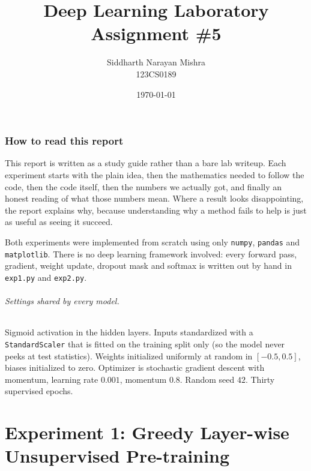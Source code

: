 \documentclass[12pt]{article}
\title{
Deep Learning Laboratory\\
Assignment \#5
}
\author{
Siddharth Narayan Mishra\\
123CS0189
}
\date{\today}
\begin{document}
\maketitle

\tableofcontents

\newpage


\section*{How to read this report}

This report is written as a study guide rather than a bare lab writeup. Each
experiment starts with the plain idea, then the mathematics needed to follow the
code, then the code itself, then the numbers we actually got, and finally an
honest reading of what those numbers mean. Where a result looks disappointing,
the report explains why, because understanding why a method fails to help is
just as useful as seeing it succeed.

Both experiments were implemented from scratch using only \texttt{numpy},
\texttt{pandas} and \texttt{matplotlib}. There is no deep learning framework
involved: every forward pass, gradient, weight update, dropout mask and softmax
is written out by hand in \texttt{exp1.py} and \texttt{exp2.py}.

\paragraph{Settings shared by every model.}
Sigmoid activation in the hidden layers. Inputs standardized with a
\texttt{StandardScaler} that is fitted on the training split only (so the model
never peeks at test statistics). Weights initialized uniformly at random in
$[-0.5, 0.5]$, biases initialized to zero. Optimizer is stochastic gradient
descent with momentum, learning rate $0.001$, momentum $0.8$. Random seed $42$.
Thirty supervised epochs.


\part*{Experiment 1: Greedy Layer-wise Unsupervised Pre-training}
\end{document}
